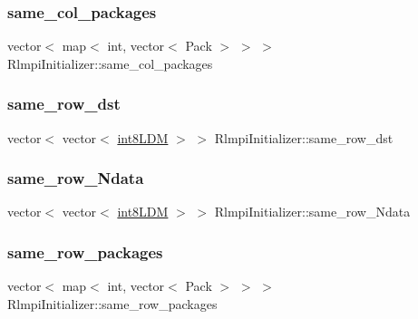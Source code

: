 \subsubsection{\texorpdfstring{same\_col\_packages}{same\_col\_packages}}
{\footnotesize\ttfamily vector$<$ map$<$ int, vector$<$ Pack $>$ $>$ $>$ Rlmpi\+Initializer\+::same\+\_\+col\+\_\+packages\hspace{0.3cm}{\ttfamily [protected]}}

\mbox{\label{classRlmpiInitializer_a8f7e3950dee221b89915b070395f383d}} 
\subsubsection{\texorpdfstring{same\_row\_dst}{same\_row\_dst}}
{\footnotesize\ttfamily vector$<$ vector$<$ \mbox{\hyperlink{include_2RlmpiShared_8h_a69782ffde89d45e86308f10afedf08a6}{int8\+L\+DM}} $>$ $>$ Rlmpi\+Initializer\+::same\+\_\+row\+\_\+dst\hspace{0.3cm}{\ttfamily [protected]}}

\mbox{\label{classRlmpiInitializer_a23f3a5eb65887094025ebfaad85dd36a}} 
\subsubsection{\texorpdfstring{same\_row\_Ndata}{same\_row\_Ndata}}
{\footnotesize\ttfamily vector$<$ vector$<$ \mbox{\hyperlink{include_2RlmpiShared_8h_a69782ffde89d45e86308f10afedf08a6}{int8\+L\+DM}} $>$ $>$ Rlmpi\+Initializer\+::same\+\_\+row\+\_\+\+Ndata\hspace{0.3cm}{\ttfamily [protected]}}

\mbox{\label{classRlmpiInitializer_aebed5253aca74dbc96d05387067ddeac}} 
\subsubsection{\texorpdfstring{same\_row\_packages}{same\_row\_packages}}
{\footnotesize\ttfamily vector$<$ map$<$ int, vector$<$ Pack $>$ $>$ $>$ Rlmpi\+Initializer\+::same\+\_\+row\+\_\+packages\hspace{0.3cm}{\ttfamily [protected]}}

